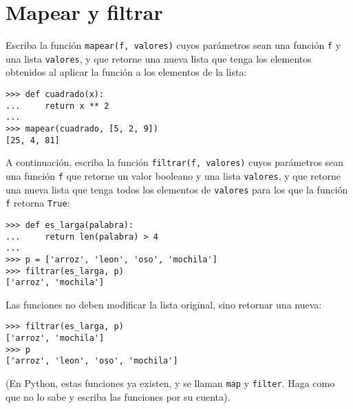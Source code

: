 \section{Mapear y filtrar}

Escriba la función \lstinline!mapear(f, valores)! cuyos parámetros sean
una función \lstinline!f! y una lista \lstinline!valores!, y que retorne
una nueva lista que tenga los elementos obtenidos al aplicar la función
a los elementos de la lista:

\begin{lstlisting}
>>> def cuadrado(x):
...     return x ** 2
...
>>> mapear(cuadrado, [5, 2, 9])
[25, 4, 81]
\end{lstlisting}

A continuación,
escriba la función \lstinline!filtrar(f, valores)! cuyos pará\-metros sean
una función \lstinline!f! que retorne un valor booleano y una lista
\lstinline!valores!, y que retorne una nueva lista que tenga todos los
elementos de \lstinline!valores! para los que la función \lstinline!f!
retorna \lstinline!True!:

\begin{lstlisting}
>>> def es_larga(palabra):
...     return len(palabra) > 4
...
>>> p = ['arroz', 'leon', 'oso', 'mochila']
>>> filtrar(es_larga, p)
['arroz', 'mochila']
\end{lstlisting}

Las funciones no deben modificar la lista original, sino retornar una
nueva:
\begin{lstlisting}
>>> filtrar(es_larga, p)
['arroz', 'mochila']
>>> p
['arroz', 'leon', 'oso', 'mochila']
\end{lstlisting}

(En Python, estas funciones ya existen, y se llaman \lstinline!map! y
\lstinline!filter!. Haga como que no lo sabe y escriba las funciones por
su cuenta).
